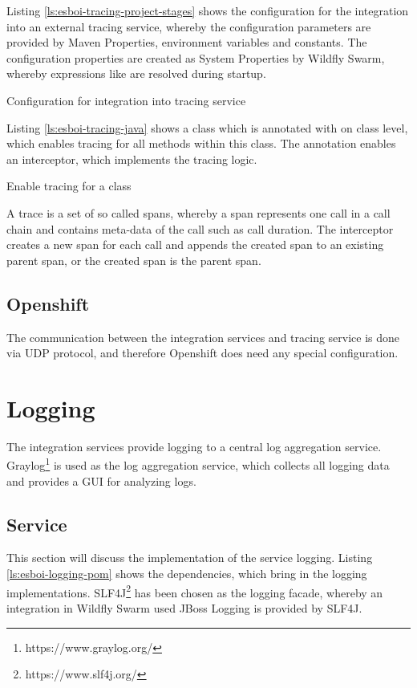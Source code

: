 Listing \vref{ls:esboi-tracing-project-stages} shows the configuration for the integration into an external tracing service, whereby the configuration parameters are provided by Maven Properties, environment variables and constants. The configuration properties are created as System Properties by Wildfly Swarm, whereby  expressions like  are resolved during startup.

\begin{listing}
	\caption{Configuration for integration into tracing service}
	\label{ls:esboi-tracing-project-stages}
\end{listing}

Listing \vref{ls:esboi-tracing-java} shows a class which is annotated with  on class level, which enables tracing for all methods within this class. The annotation  enables an interceptor, which implements the tracing logic. 

\begin{listing}
	\caption{Enable tracing for a class}
	\label{ls:esboi-tracing-java}
\end{listing}

A trace is a set of so called spans, whereby a span represents one call in a call chain and contains meta-data of the call such as call duration. The interceptor creates a new span for each call and appends the created span to an existing parent span, or the created span is the parent span. 

\subsection{Openshift}
\label{sec:esbi-tracing-openshift}
The communication between the integration services and tracing service is done via UDP protocol, and therefore Openshift does need any special configuration.

\section{Logging}
\label{sec:esbi-logging}
The integration services provide logging to a central log aggregation service. Graylog\footnote{https://www.graylog.org/} is used as the log aggregation service, which collects all logging data and provides a GUI for analyzing logs.
\newpage

\subsection{Service}
\label{sec:esbi-logging-service}
This section will discuss the implementation of the service logging. Listing \vref{ls:esboi-logging-pom} shows the dependencies, which bring in the logging implementations. SLF4J\footnote{https://www.slf4j.org/} has been chosen as the logging facade, whereby an integration in Wildfly Swarm used JBoss Logging is provided by SLF4J.

